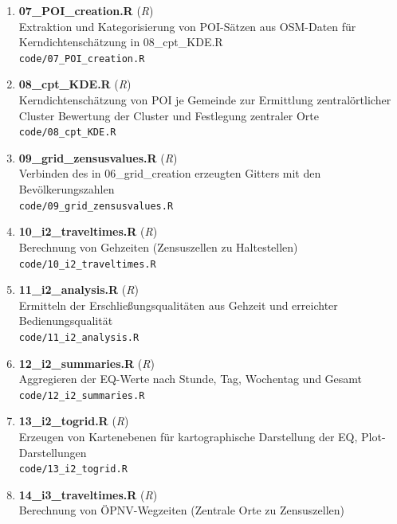 \begin{enumerate}[label=\arabic*, leftmargin=*, itemsep=0.5em, topsep=0.3em]
\begin{enumerate}[label=\arabic{enumi}.\arabic*, leftmargin=*, itemsep=0.5em, topsep=0.3em]
Erstellung eines EPSG:3035-Geogitters mit 100 m Kantenlänge und INSPIRE-konformen Gitter-Ids für das Untersuchungsgebiet\\
\texttt{\small code/06\_grid\_creation.R}
\item \textbf{07\_POI\_creation.R} \textnormal{(\textit{R})}\\
Extraktion und Kategorisierung von POI-Sätzen aus OSM-Daten für Kerndichtenschätzung in 08\_cpt\_KDE.R\\
\texttt{\small code/07\_POI\_creation.R}
\item \textbf{08\_cpt\_KDE.R} \textnormal{(\textit{R})}\\
Kerndichtenschätzung von POI je Gemeinde zur Ermittlung zentralörtlicher Cluster
Bewertung der Cluster und Festlegung zentraler Orte\\
\texttt{\small code/08\_cpt\_KDE.R}
\item \textbf{09\_grid\_zensusvalues.R} \textnormal{(\textit{R})}\\
Verbinden des in 06\_grid\_creation erzeugten Gitters mit den Bevölkerungszahlen\\
\texttt{\small code/09\_grid\_zensusvalues.R}
\item \textbf{10\_i2\_traveltimes.R} \textnormal{(\textit{R})}\\
Berechnung von Gehzeiten (Zensuszellen zu Haltestellen)\\
\texttt{\small code/10\_i2\_traveltimes.R}
\item \textbf{11\_i2\_analysis.R} \textnormal{(\textit{R})}\\
Ermitteln der Erschließungsqualitäten aus Gehzeit und erreichter Bedienungsqualität\\
\texttt{\small code/11\_i2\_analysis.R}
\item \textbf{12\_i2\_summaries.R} \textnormal{(\textit{R})}\\
Aggregieren der EQ-Werte nach Stunde, Tag, Wochentag und Gesamt\\
\texttt{\small code/12\_i2\_summaries.R}
\item \textbf{13\_i2\_togrid.R} \textnormal{(\textit{R})}\\
Erzeugen von Kartenebenen für kartographische Darstellung der EQ, Plot-Darstellungen\\
\texttt{\small code/13\_i2\_togrid.R}
\item \textbf{14\_i3\_traveltimes.R} \textnormal{(\textit{R})}\\
Berechnung von ÖPNV-Wegzeiten (Zentrale Orte zu Zensuszellen)\\

\end{enumerate}
\end{enumerate}
